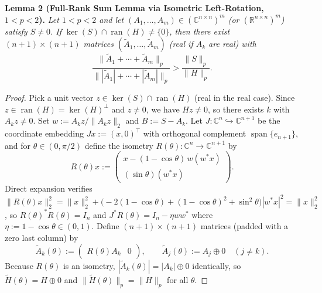 \documentclass[10pt,letterpaper]{article}
\newcommand{\C}{\mathbb{C}}
\newcommand{\R}{\mathbb{R}}
\newcommand{\ran}{\operatorname{ran}}
\begin{document}
\begin{tcolorbox}[lemmabox]
\textbf{Lemma 2 (Full-Rank Sum Lemma via Isometric Left-Rotation, $1 < p < 2$).}
\emph{Let $1 < p < 2$ and let $(A_1,\dots,A_m) \in (\C^{n\times n})^m$ (or $(\R^{n\times n})^m$) satisfy $S \neq 0$. If $\ker(S) \cap \ran(H) \neq \{0\}$, then there exist $(n+1)\times(n+1)$ matrices $(\widetilde{A}_1,\dots,\widetilde{A}_m)$ (real if $A_k$ are real) with}
\[
  \frac{\|\widetilde{A}_1 + \cdots + \widetilde{A}_m\|_p}{\||\widetilde{A}_1| + \cdots + |\widetilde{A}_m|\|_p} > \frac{\|S\|_p}{\|H\|_p}.
\]
\end{tcolorbox}

\begin{proof}
Pick a unit vector $z \in \ker(S) \cap \ran(H)$ (real in the real case). Since $z \in \ran(H) = \ker(H)^\perp$ and $z \neq 0$, we have $Hz \neq 0$, so there exists $k$ with $A_k z \neq 0$. Set $w := A_k z / \|A_k z\|_2$ and $B := S - A_k$. Let $J : \C^n \hookrightarrow \C^{n+1}$ be the coordinate embedding $Jx := (x, 0)^\top$ with orthogonal complement $\operatorname{span}\{e_{n+1}\}$, and for $\theta \in (0, \pi/2)$ define the isometry $R(\theta) : \C^n \to \C^{n+1}$ by
\[
  R(\theta)x := \begin{pmatrix} x - (1 - \cos\theta)\,w(w^* x) \\ (\sin\theta)(w^* x) \end{pmatrix}.
\]
Direct expansion verifies $\|R(\theta)x\|_2^2 = \|x\|_2^2 + \bigl(-2(1-\cos\theta) + (1-\cos\theta)^2 + \sin^2\theta\bigr)|w^* x|^2 = \|x\|_2^2$, so $R(\theta)^* R(\theta) = I_n$ and $J^* R(\theta) = I_n - \eta w w^*$ where $\eta := 1 - \cos\theta \in (0,1)$. Define $(n+1)\times(n+1)$ matrices (padded with a zero last column) by
\[
  \widetilde{A}_k(\theta) := \begin{pmatrix} R(\theta) A_k & 0 \end{pmatrix}, \qquad
  \widetilde{A}_j(\theta) := A_j \oplus 0 \quad (j \neq k).
\]
Because $R(\theta)$ is an isometry, $|\widetilde{A}_k(\theta)| = |A_k| \oplus 0$ identically, so $\widetilde{H}(\theta) = H \oplus 0$ and $\|\widetilde{H}(\theta)\|_p = \|H\|_p$ for all $\theta$.


\end{proof}
\end{document}
